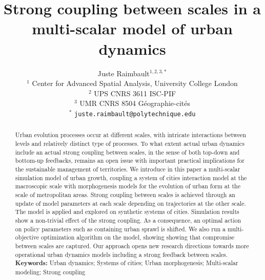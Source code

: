 \documentclass[11pt]{article}
\title{Strong coupling between scales in a multi-scalar model of urban dynamics}
\author{Juste Raimbault$^{1,2,3,\ast}$\medskip\\
$^{1}$ Center for Advanced Spatial Analysis, University College London\\
$^{2}$ UPS CNRS 3611 ISC-PIF\\
$^{3}$ UMR CNRS 8504 G{\'e}ographie-cit{\'e}s\medskip\\
$^{\ast}$ \texttt{juste.raimbault@polytechnique.edu}
}
\date{}
\begin{document}
\maketitle


\begin{abstract}
	Urban evolution processes occur at different scales, with intricate interactions between levels and relatively distinct type of processes. To what extent actual urban dynamics include an actual strong coupling between scales, in the sense of both top-down and bottom-up feedbacks, remains an open issue with important practical implications for the sustainable management of territories. We introduce in this paper a multi-scalar simulation model of urban growth, coupling a system of cities interaction model at the macroscopic scale with morphogenesis models for the evolution of urban form at the scale of metropolitan areas. Strong coupling between scales is achieved through an update of model parameters at each scale depending on trajectories at the other scale. The model is applied and explored on synthetic systems of cities. Simulation results show a non-trivial effect of the strong coupling. As a consequence, an optimal action on policy parameters such as containing urban sprawl is shifted. We also run a multi-objective optimization algorithm on the model, showing showing that compromise between scales are captured. Our approach opens new research directions towards more operational urban dynamics models including a strong feedback between scales.
	\medskip\\
\textbf{Keywords: } Urban dynamics; Systems of cities; Urban morphogenesis; Multi-scalar modeling; Strong coupling
\end{abstract}


\end{document}
